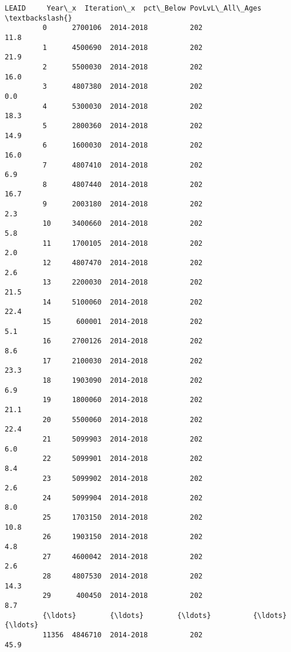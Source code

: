 \documentclass[11pt]{article}
\begin{document}
\begin{Verbatim}[commandchars=\\\{\}]
                  LEAID     Year\_x  Iteration\_x  pct\_Below PovLvL\_All\_Ages  \textbackslash{}
         0      2700106  2014-2018          202                       11.8   
         1      4500690  2014-2018          202                       21.9   
         2      5500030  2014-2018          202                       16.0   
         3      4807380  2014-2018          202                        0.0   
         4      5300030  2014-2018          202                       18.3   
         5      2800360  2014-2018          202                       14.9   
         6      1600030  2014-2018          202                       16.0   
         7      4807410  2014-2018          202                        6.9   
         8      4807440  2014-2018          202                       16.7   
         9      2003180  2014-2018          202                        2.3   
         10     3400660  2014-2018          202                        5.8   
         11     1700105  2014-2018          202                        2.0   
         12     4807470  2014-2018          202                        2.6   
         13     2200030  2014-2018          202                       21.5   
         14     5100060  2014-2018          202                       22.4   
         15      600001  2014-2018          202                        5.1   
         16     2700126  2014-2018          202                        8.6   
         17     2100030  2014-2018          202                       23.3   
         18     1903090  2014-2018          202                        6.9   
         19     1800060  2014-2018          202                       21.1   
         20     5500060  2014-2018          202                       22.4   
         21     5099903  2014-2018          202                        6.0   
         22     5099901  2014-2018          202                        8.4   
         23     5099902  2014-2018          202                        2.6   
         24     5099904  2014-2018          202                        8.0   
         25     1703150  2014-2018          202                       10.8   
         26     1903150  2014-2018          202                        4.8   
         27     4600042  2014-2018          202                        2.6   
         28     4807530  2014-2018          202                       14.3   
         29      400450  2014-2018          202                        8.7   
         {\ldots}        {\ldots}        {\ldots}          {\ldots}                        {\ldots}   
         11356  4846710  2014-2018          202                       45.9   

\end{Verbatim}
\end{document}
